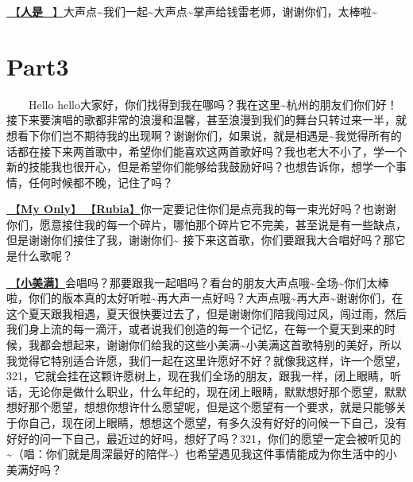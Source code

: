 \documentclass[]{ctexbook}
\begin{document}
\hyperref[renshi]{🎵【\textbf{人是\_}】}大声点\textasciitilde 我们一起\textasciitilde 大声点\textasciitilde 掌声给钱雷老师，谢谢你们，太棒啦\textasciitilde{}

\section{Part3}\label{hangzhou-20240823-part3}

  Hello hello大家好，你们找得到我在哪吗？我在这里\textasciitilde 杭州的朋友们你们好！接下来要演唱的歌都非常的浪漫和温馨，甚至浪漫到我们的舞台只转过来一半，就想看下你们岂不期待我的出现啊？谢谢你们，如果说，就是相遇是\textasciitilde 我觉得所有的话都在接下来两首歌中，希望你们能喜欢这两首歌好吗？我也老大不小了，学一个新的技能我也很开心，但是希望你们能够给我鼓励好吗？也想告诉你，想学一个事情，任何时候都不晚，记住了吗？

\hyperref[my-only]{🎵【\textbf{My Only}】}\hyperref[rubia]{🎵【\textbf{Rubia}】}你一定要记住你们是点亮我的每一束光好吗？也谢谢你们，愿意接住我的每一个碎片，哪怕那个碎片它不完美，甚至说是有一些缺点，但是谢谢你们接住了我，谢谢你们\textasciitilde{}
接下来这首歌，你们要跟我大合唱好吗？那它是什么歌呢？

\hyperref[happy-ending]{🎵【\textbf{小美满}】}会唱吗？那要跟我一起唱吗？看台的朋友大声点哦\textasciitilde 全场\textasciitilde 你们太棒啦，你们的版本真的太好听啦\textasciitilde 再大声一点好吗？大声点哦\textasciitilde 再大声\textasciitilde 谢谢你们，在这个夏天跟我相遇，夏天很快要过去了，但是谢谢你们陪我闯过风，闯过雨，然后我们身上流的每一滴汗，或者说我们创造的每一个记忆，在每一个夏天到来的时候，我都会想起来，谢谢你们给我的这些小美满\textasciitilde 小美满这首歌特别的美好，所以我觉得它特别适合许愿，我们一起在这里许愿好不好？就像我这样，许一个愿望，321，它就会挂在这颗许愿树上，现在我们全场的朋友，跟我一样，闭上眼睛，听话，无论你是做什么职业，什么年纪的，现在闭上眼睛，默默想好那个愿望，默默想好那个愿望，想想你想许什么愿望呢，但是这个愿望有一个要求，就是只能够关于你自己，现在闭上眼睛，想想这个愿望，有多久没有好好的问候一下自己，没有好好的问一下自己，最近过的好吗，想好了吗？321，你们的愿望一定会被听见的\textasciitilde（唱：你们就是周深最好的陪伴\textasciitilde）也希望遇见我这件事情能成为你生活中的小美满好吗？
\end{document}
